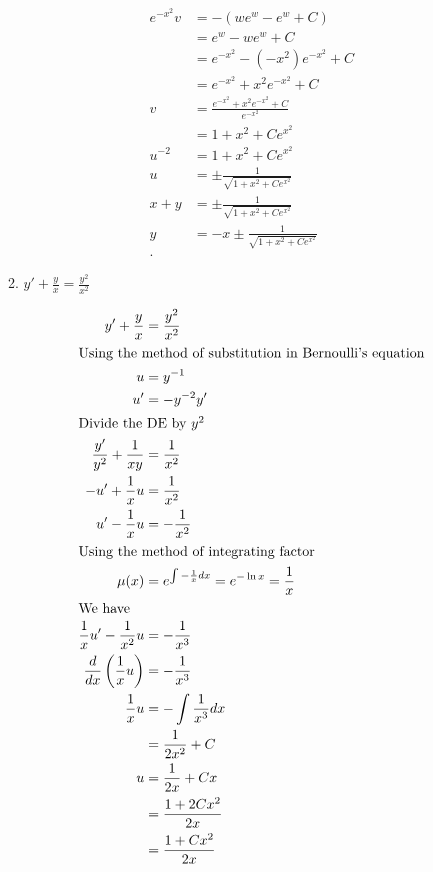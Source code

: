\documentclass{zc-ust-hw}
\begin{document}
\begin{enumerate}
\begin{enumerate}
\begin{sol}
\begin{align}
            e^{-x^2}v&=-(we^w-e^w+C)\\
                     &=e^w-we^w+C\\
                     &=e^{-x^2} -(-x^2)e^{-x^2} +C\\
                     &=e^{-x^2}+x^2e^{-x^2} +C\\
            v&=\frac{e^{-x^2}+x^2e^{-x^2} +C}{e^{-x^2}}\\
             &= 1+x^2+C e^{x^2}\\
            u^{-2} &= 1+x^2+C e^{x^2}\\
            u &= \pm\frac{1}{\sqrt{1+x^2+C e^{x^2}}}\\
            x+y &= \pm\frac{1}{\sqrt{1+x^2+C e^{x^2}}}\\
            y &= -x\pm\frac{1}{\sqrt{1+x^2+C e^{x^2}}}\\
          .\end{align}
        \end{sol}
      \item $y'+\frac{y}{x}=\frac{y^2}{x^2}$
        \begin{sol}
          \begin{align}
            y'+\frac{y}{x}&=\frac{y^2}{x^2} \\
            \intertext{Using the method of substitution in Bernoulli's
            equation}
            u &= y^{-1} \\
            u' &= -y^{-2} y' \\
            \intertext{Divide the DE by $y^2$}
            \frac{y'}{y^2}+\frac{1}{xy}&=\frac{1}{x^2}\\
            -u'+\frac{1}{x}u&=\frac{1}{x^2}\\
            u'-\frac{1}{x}u&=-\frac{1}{x^2}\\
            \intertext{Using the method of integrating factor}
            \mu(x)&=e^{\int -\frac{1}{x} dx}=e^{-\ln x}=\frac{1}{x}\\
            \intertext{We have}
            \frac{1}{x}u'-\frac{1}{x^2}u&=-\frac{1}{x^3}\\
            \frac{d}{dx}\left(\frac{1}{x}u\right)&=-\frac{1}{x^3}\\
            \frac{1}{x}u&=-\int\frac{1}{x^3} dx\\
                        &=\frac{1}{2x^2}+C\\
            u&=\frac{1}{2x}+Cx\\
             &=\frac{1+2Cx^2}{2x}\\
             &=\frac{1+Cx^2}{2x}\\

\end{align}
\end{sol}
\end{enumerate}
\end{enumerate}
\end{document}
